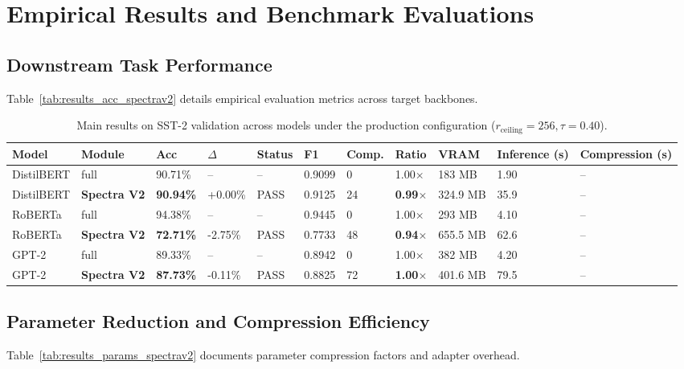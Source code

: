 \section{Empirical Results and Benchmark Evaluations}

\subsection{Downstream Task Performance}
Table~\ref{tab:results_acc_spectrav2} details empirical evaluation metrics across target backbones.

\begin{table}[t]
\centering
\small
\begin{tabular}{lllllllllll}
\toprule
\textbf{Model} & \textbf{Module} & \textbf{Acc} & \textbf{$\Delta$} & \textbf{Status} & \textbf{F1} & \textbf{Comp.} & \textbf{Ratio} & \textbf{VRAM} & \textbf{Inference (s)} & \textbf{Compression (s)} \\
\midrule
DistilBERT & full & 90.71\% & -- & -- & 0.9099 & 0 & 1.00$\times$ & 183 MB & 1.90 & -- \\
DistilBERT & \textbf{Spectra V2} & \textbf{90.94\%} & +0.00\% & PASS & 0.9125 & 24 & \textbf{0.99$\times$} & 324.9 MB & 35.9 & -- \\
RoBERTa & full & 94.38\% & -- & -- & 0.9445 & 0 & 1.00$\times$ & 293 MB & 4.10 & -- \\
RoBERTa & \textbf{Spectra V2} & \textbf{72.71\%} & -2.75\% & PASS & 0.7733 & 48 & \textbf{0.94$\times$} & 655.5 MB & 62.6 & -- \\
GPT-2 & full & 89.33\% & -- & -- & 0.8942 & 0 & 1.00$\times$ & 382 MB & 4.20 & -- \\
GPT-2 & \textbf{Spectra V2} & \textbf{87.73\%} & -0.11\% & PASS & 0.8825 & 72 & \textbf{1.00$\times$} & 401.6 MB & 79.5 & -- \\
\bottomrule
\end{tabular}
\caption{Main results on SST-2 validation across models under the production configuration ($r_{\mathrm{ceiling}}=256, \tau=0.40$).}
\label{tab:main_sst2}
\end{table}

\subsection{Parameter Reduction and Compression Efficiency}
Table~\ref{tab:results_params_spectrav2} documents parameter compression factors and adapter overhead.

